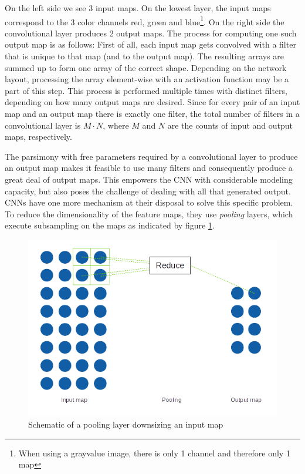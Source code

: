 \documentclass[11pt, a4paper]{article}
\begin{document}
On the left side we see 3 input maps. On the lowest layer, the input maps correspond to the 3 color channels red, green and blue\footnote{When using a grayvalue image, there is only 1 channel and therefore only 1 map}. On the right side the convolutional layer produces 2 output maps. The process for computing one such output map is as follows: First of all, each input map gets convolved with a filter that is unique to that map (and to the output map). The resulting arrays are summed up to form one array of the correct shape. Depending on the network layout, processing the array element-wise with an activation function may be a part of this step. This process is performed multiple times with distinct filters, depending on how many output maps are desired. Since for every pair of an input map and an output map there is exactly one filter, the total number of filters in a convolutional layer is $M \cdot N$, where $M$ and $N$ are the counts of input and output maps, respectively.

The parsimony with free parameters required by a convolutional layer to produce an output map makes it feasible to use many filters and consequently produce a great deal of output maps. This empowers the CNN with considerable modeling capacity, but also poses the challenge of dealing with all that generated output. CNNs have one more mechanism at their disposal to solve this specific problem. To reduce the dimensionality of the feature maps, they use \emph{pooling} layers, which execute subsampling on the maps as indicated by figure \ref{fig:pooling-layer}.

\begin{figure}[htp]
	\centering
	\includegraphics[scale=1.00]{images/pooling_layer.png}
	\caption{Schematic of a pooling layer downsizing an input map}
	\label{fig:pooling-layer}
\end{figure}
\end{document}
